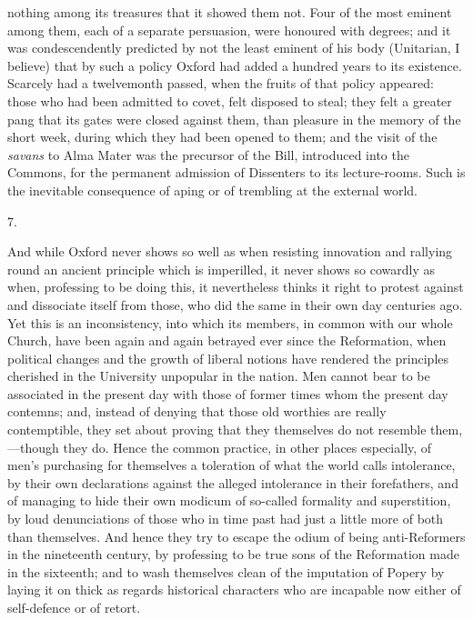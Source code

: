 nothing among its treasures that it showed them not. Four of the most
eminent among them, each of a separate persuasion, were honoured with
degrees; and it was condescendently predicted by not the least eminent
of his body (Unitarian, I believe) that by such a policy Oxford had
added a hundred years to its existence. Scarcely had a twelvemonth
passed, when the fruits of that policy appeared: those who had been
admitted to covet, felt disposed to steal; they felt a greater pang
that its gates were closed against them, than pleasure in the memory
of the short week, during which they had been opened to them; and the
visit of the \emph{savans} to Alma Mater was the precursor of the
Bill, introduced into the Commons, for the permanent admission of
Dissenters to its lecture-rooms. Such is the inevitable consequence of
aping or of trembling at the external world.

7.

And while Oxford never shows
so well as when resisting innovation and rallying round an ancient
principle which is imperilled, it never shows so cowardly as when,
professing to be doing this, it nevertheless thinks it right to
protest against and dissociate itself from those, who did the same in
their own day centuries ago. Yet this is an inconsistency, into which
its members, in common with our whole Church, have been again and
again betrayed ever since the Reformation, when political changes and
the growth of liberal notions have rendered the principles cherished
in the University unpopular in the nation. Men cannot bear to be
associated in the present day with those of former times whom the
present day contemns; and, instead of denying that those old worthies
are really contemptible, they set about proving that they themselves
do not resemble them,—though they do. Hence the common practice, in
other places especially, of men's purchasing for themselves a
toleration of what the world calls intolerance, by their own
declarations against the alleged intolerance in their forefathers, and
of managing to hide their own modicum of so-called formality and
superstition, by loud denunciations of those who in time past had just
a little more of both than themselves. And hence they try to escape
the odium of being anti-Reformers in the nineteenth century, by
professing to be true sons of the Reformation made in the sixteenth;
and to wash themselves clean of the imputation of Popery by laying it
on thick as regards historical characters who are incapable now either
of self-defence or of retort.

